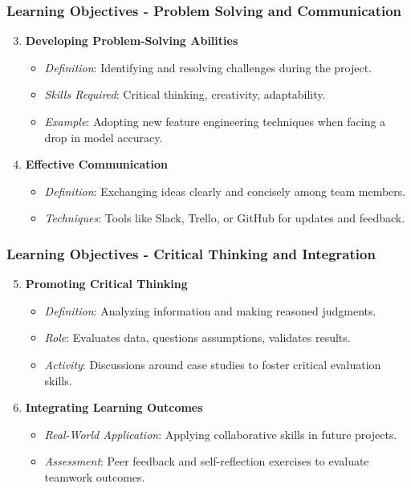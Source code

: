 \documentclass[aspectratio=169]{beamer}
\begin{document}
\begin{frame}[fragile]
    \frametitle{Learning Objectives - Problem Solving and Communication}
    \begin{enumerate}
        \setcounter{enumi}{2}
        \item \textbf{Developing Problem-Solving Abilities}
        \begin{itemize}
            \item \textit{Definition}: Identifying and resolving challenges during the project.
            \item \textit{Skills Required}: Critical thinking, creativity, adaptability.
            \item \textit{Example}: Adopting new feature engineering techniques when facing a drop in model accuracy.
        \end{itemize}

        \item \textbf{Effective Communication}
        \begin{itemize}
            \item \textit{Definition}: Exchanging ideas clearly and concisely among team members.
            \item \textit{Techniques}: Tools like Slack, Trello, or GitHub for updates and feedback.
        \end{itemize}
    \end{enumerate}
\end{frame}

\begin{frame}[fragile]
    \frametitle{Learning Objectives - Critical Thinking and Integration}
    \begin{enumerate}
        \setcounter{enumi}{4}
        \item \textbf{Promoting Critical Thinking}
        \begin{itemize}
            \item \textit{Definition}: Analyzing information and making reasoned judgments.
            \item \textit{Role}: Evaluates data, questions assumptions, validates results.
            \item \textit{Activity}: Discussions around case studies to foster critical evaluation skills.
        \end{itemize}

        \item \textbf{Integrating Learning Outcomes}
        \begin{itemize}
            \item \textit{Real-World Application}: Applying collaborative skills in future projects.
            \item \textit{Assessment}: Peer feedback and self-reflection exercises to evaluate teamwork outcomes.
        \end{itemize}
    \end{enumerate}
\end{frame}
\end{document}
